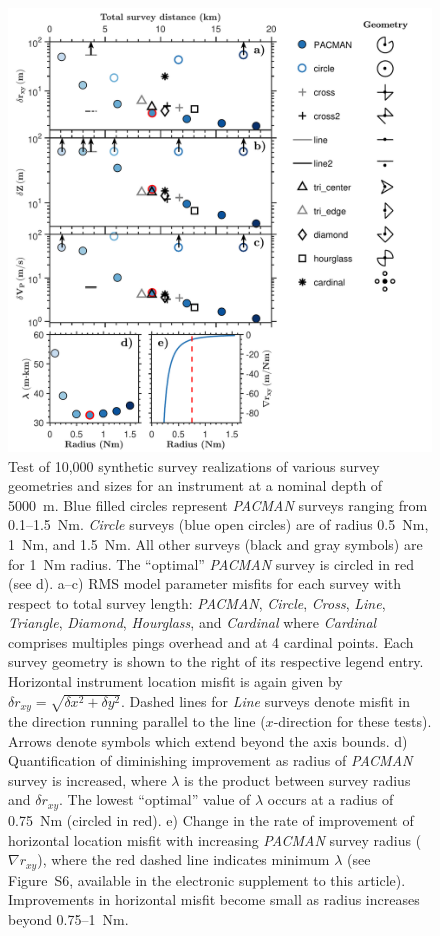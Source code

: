 \begin{figure}[h]
\includegraphics[trim=0cm 0cm 0cm 0cm,clip=true,width=\columnwidth]{Figure06_z5000m.pdf}
\caption{ Test of 10,000 synthetic survey realizations of various survey geometries and sizes for an instrument at a nominal depth of 5000~m. Blue filled circles represent \textit{PACMAN} surveys ranging from 0.1--1.5~Nm. \textit{Circle} surveys (blue open circles) are of radius 0.5~Nm, 1~Nm, and 1.5~Nm. All other surveys (black and gray symbols) are for 1~Nm radius. The ``optimal'' \textit{PACMAN} survey is circled in red (see d). a--c) RMS model parameter misfits for each survey with respect to total survey length: \textit{PACMAN}, \textit{Circle}, \textit{Cross}, \textit{Line}, \textit{Triangle}, \textit{Diamond}, \textit{Hourglass}, and \textit{Cardinal} where \textit{Cardinal} comprises multiples pings overhead and at 4 cardinal points. Each survey geometry is shown to the right of its respective legend entry. Horizontal instrument location misfit is again given by $\delta r_{xy} = \sqrt{\delta x^2 + \delta y^2} $. Dashed lines for \textit{Line} surveys denote misfit in the direction running parallel to the line ($x$-direction for these tests). Arrows denote symbols which extend beyond the axis bounds. d) Quantification of diminishing improvement as radius of \textit{PACMAN} survey is increased, where $\lambda$ is the product between survey radius and $\delta r_{xy}$. The lowest ``optimal'' value of $\lambda$ occurs at a radius of 0.75~Nm (circled in red). e) Change in the rate of improvement of horizontal location misfit with increasing \textit{PACMAN} survey radius ($\nabla r_{xy}$), where the red dashed line indicates minimum $\lambda$ (see Figure~S6, available in the electronic supplement to this article). Improvements in horizontal misfit become small as radius increases beyond 0.75--1~Nm.}
\label{fig:survey_geom_explore}
\end{figure}

